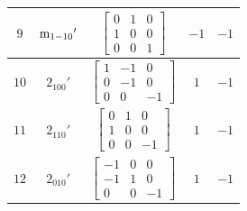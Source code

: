 \documentclass[fleqn,8pt]{jsarticle}
\begin{document}
\begin{longtable}{ccccc}
$ 9 $ & $ {\rm m}_{1-10}{}' $ & $ \begin{bmatrix} 0 & 1 & 0 \\ 1 & 0 & 0 \\ 0 & 0 & 1 \end{bmatrix} $ & $ -1 $ & $ -1 $ \\ \hline
$ 10 $ & $ 2{}_{100}{}' $ & $ \begin{bmatrix} 1 & -1 & 0 \\ 0 & -1 & 0 \\ 0 & 0 & -1 \end{bmatrix} $ & $ 1 $ & $ -1 $ \\ \hline
$ 11 $ & $ 2{}_{110}{}' $ & $ \begin{bmatrix} 0 & 1 & 0 \\ 1 & 0 & 0 \\ 0 & 0 & -1 \end{bmatrix} $ & $ 1 $ & $ -1 $ \\ \hline
$ 12 $ & $ 2{}_{010}{}' $ & $ \begin{bmatrix} -1 & 0 & 0 \\ -1 & 1 & 0 \\ 0 & 0 & -1 \end{bmatrix} $ & $ 1 $ & $ -1 $ \\
\end{longtable}
\end{document}
